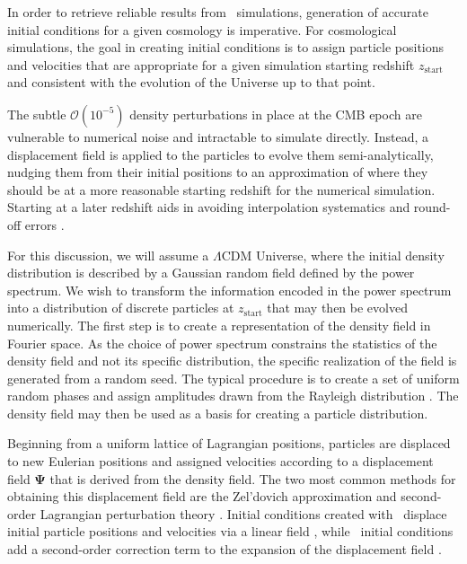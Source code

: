 In order to retrieve reliable results from \nbody\ simulations, generation of accurate initial conditions for a given cosmology is imperative.  For cosmological simulations, the goal in creating initial conditions is to assign particle positions and velocities that are appropriate for a given simulation starting redshift $z_{\mathrm{start}}$ and consistent with the evolution of the Universe up to that point.

The subtle $\mathcal{O}(10^{-5})$ density perturbations in place at the CMB epoch are vulnerable to numerical noise and intractable to simulate directly.  Instead, a displacement field is applied to the particles to evolve them semi-analytically, nudging them from their initial positions to an approximation of where they should be at a more reasonable starting redshift for the numerical simulation.  Starting at a later redshift aids in avoiding interpolation systematics and round-off errors \citep{2007ApJ...671.1160L}.

For this discussion, we will assume a $\Lambda$CDM Universe, where the initial density distribution is described by a Gaussian random field defined by the power spectrum.  We wish to transform the information encoded in the power spectrum into a distribution of discrete particles at $z_{\mathrm{start}}$ that may then be evolved numerically.  The first step is to create a representation of the density field in Fourier space.  As the choice of power spectrum constrains the statistics of the density field and not its specific distribution, the specific realization of the field is generated from a random seed.  The typical procedure is to create a set of uniform random phases and assign amplitudes drawn from the Rayleigh distribution \citep{1985ApJS...57..241E}.  The density field may then be used as a basis for creating a particle distribution.

Beginning from a uniform lattice of Lagrangian positions, particles are displaced to new Eulerian positions and assigned velocities according to a displacement field $\boldsymbol{\Psi}$ that is derived from the density field.  The two most common methods for obtaining this displacement field are the Zel'dovich approximation \citep[\za,][]{1970A&A.....5...84Z} and second-order Lagrangian perturbation theory \citep[\lpt,][]{1994MNRAS.267..811B, 1994A&A...288..349B, 1995A&A...296..575B, 1998MNRAS.299.1097S}.  Initial conditions created with \za\ displace initial particle positions and velocities via a linear field \citep{1983MNRAS.204..891K, 1985ApJS...57..241E}, while \lpt\ initial conditions add a second-order correction term to the expansion of the displacement field \citep{1998MNRAS.299.1097S, 2005ApJ...634..728S, 2010MNRAS.403.1859J}.




